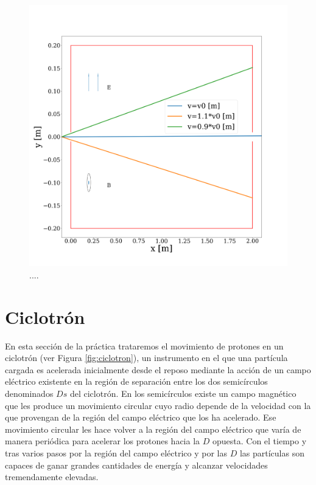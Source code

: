 \documentclass[journal]{IEEEtran}
\begin{document}
\begin{figure}[!htb]
    \includegraphics[width=\linewidth]{selector_simulacion}
    \caption{....}
    \label{fig:selector_simulacion}
\end{figure}

\clearpage

\section{Ciclotrón}
\label{sec:ciclotron}

En esta sección de la práctica trataremos el movimiento de protones en un ciclotrón (ver Figura \ref{fig:ciclotron}), un instrumento en el que una partícula cargada es acelerada inicialmente desde el reposo mediante la acción de un campo eléctrico existente en la región de separación entre los dos semicírculos denominados $Ds$ del ciclotrón. En los semicírculos existe un campo magnético que les produce un movimiento circular cuyo radio depende de la velocidad con la que provengan de la región del campo eléctrico que los ha acelerado. Ese movimiento circular les hace volver a la región del campo eléctrico que varía de manera periódica para acelerar los protones hacia la $D$ opuesta. Con el tiempo y tras varios pasos por la región del campo eléctrico y por las $D$ las partículas son capaces de ganar grandes cantidades de energía y alcanzar velocidades tremendamente elevadas.
\end{document}
